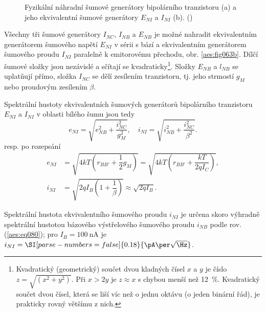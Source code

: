         \begin{figure}[ht!]  %
          \centering
          \caption{ Fyzikální náhradní šumové generátory bipolárního tranzistoru (a) a jeho
                    ekvivalentní šumové generátory \(E_{NI}\) a \(I_{NI}\) (b).
                    (\cite[s.~51]{Dostal})}
          \label{aes:fig063}
        \end{figure} 

        Všechny tři šumové generátory \(I_{NC}\), \(I_{NB}\) a \(E_{NB}\) je možné nahradit
        ekvivalentním generátorem šumového napětí \(E_{NI}\) v sérii s bází a ekvivalentním
        generátorem šumového proudu \(I_{NI}\) paralelně k emitorovému přechodu, obr.
        \ref{aes:fig063b}. Dílčí šumové složky jsou nezávislé a sčítají se
        kvadraticky\footnote{Kvadratický (geometrický) součet dvou kladných čísel \(x\) a \(y\) je
        číslo \(z = \sqrt{(x^2 + y^2)}\). Při \(x > 2y\) je \(z \approx x\) s chybou menší než
        \SI{12}{\percent}. Kvadratický součet dvou čísel, která se liší víc než o jednu oktávu (o
        jeden binární řád), je prakticky rovný většímu z nich.}. Složky \(E_{NB}\) a \(l_{NB}\) se
        uplatňují přímo, složka \(I_{NC}\) se dělí zesílením tranzistoru, tj. jeho strmostí \(g_M\)
        nebo proudovým zesílením \(\beta\).

        Spektrální hustoty ekvivalentních šumových generátorů bipolárního tranzistoru \(E_{NI}\) a
        \(I_{NI}\) v oblasti bílého šumu jsou tedy
        \begin{equation}\label{aes:eq082}
          e_{NI} = \sqrt{e_{NB}^2 + \dfrac{i_{NC}^2}{g_M^2}}, \quad
          i_{NI} = \sqrt{i_{NB}^2 + \dfrac{i_{NC}^2}{\beta^2}}.
        \end{equation} 
        resp. po rozepsání
        \begin{align}
          e_{NI} &= \sqrt{4kT\left(r_{BB'} + \dfrac{1}{2}g_M\right)} 
                  = \sqrt{4kT\left(r_{BB'} + \dfrac{kT}{2qI_C}\right)},  \label{aes:eq083a} \\
          i_{NI} &= \sqrt{2qI_B\left(1 + \dfrac{1}{\beta}\right)} 
                    \approx\sqrt{2qI_B}.                                 \label{aes:eq083b}  
        \end{align}

        Spektrální hustota ekvivalentního šumového proudu \(i_{NI}\) je určena skoro výhradně
        spektrální hustotou bázového výstřelového šumového proudu \(i_{NB}\) podle rov.
        (\ref{aes:eq080}); pro \(I_B = \SI{100}{\nA}\) je \(i_{NI} = \SI[parse-numbers =
        false]{0.18}{\pA\per\sqrt{\Hz}}\). 

